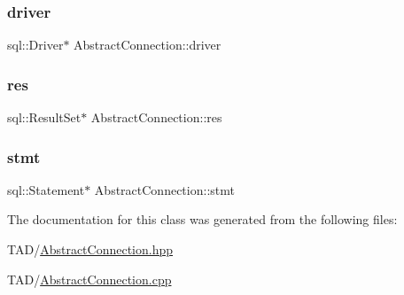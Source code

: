 \subsubsection{\texorpdfstring{driver}{driver}}
{\footnotesize\ttfamily sql\+::\+Driver$\ast$ Abstract\+Connection\+::driver\hspace{0.3cm}{\ttfamily [protected]}}

\mbox{\label{class_abstract_connection_a4dd12c03bfa5f7d03a231c32c2e01a90}} 
\subsubsection{\texorpdfstring{res}{res}}
{\footnotesize\ttfamily sql\+::\+Result\+Set$\ast$ Abstract\+Connection\+::res\hspace{0.3cm}{\ttfamily [protected]}}

\mbox{\label{class_abstract_connection_a1ef8a1192a35a535ba523a015c0890ec}} 
\subsubsection{\texorpdfstring{stmt}{stmt}}
{\footnotesize\ttfamily sql\+::\+Statement$\ast$ Abstract\+Connection\+::stmt\hspace{0.3cm}{\ttfamily [protected]}}



The documentation for this class was generated from the following files\+:\begin{DoxyCompactItemize}
\item 
T\+A\+D/\hyperlink{_abstract_connection_8hpp}{Abstract\+Connection.\+hpp}\item 
T\+A\+D/\hyperlink{_abstract_connection_8cpp}{Abstract\+Connection.\+cpp}\end{DoxyCompactItemize}
